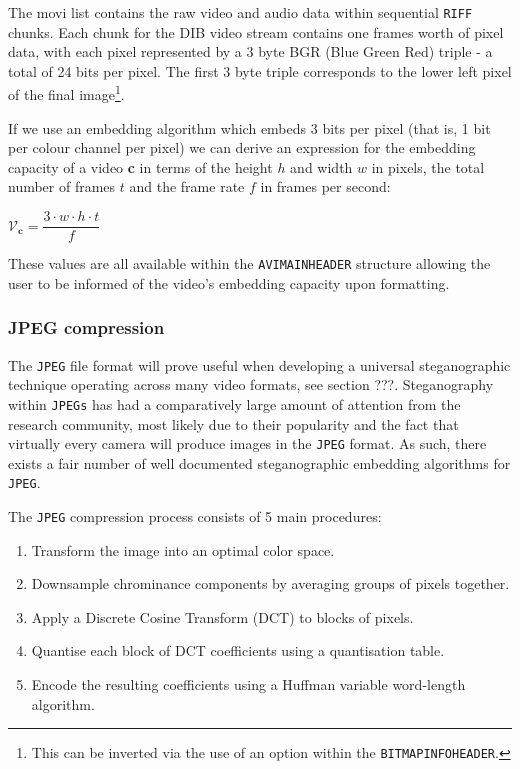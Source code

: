 \documentclass[paper=a4, fontsize=11pt,twoside]{scrartcl}    %
\begin{document}
The movi list contains the raw video and audio data within sequential \texttt{RIFF} chunks. Each chunk for the DIB video stream contains one frames worth of pixel data, with each pixel represented by a 3 byte BGR (Blue Green Red) triple - a total of 24 bits per pixel. The first 3 byte triple corresponds to the lower left pixel of the final image\footnote{This can be inverted via the use of an option within the \texttt{BITMAPINFOHEADER}.}. 

If we use an embedding algorithm which embeds 3 bits per pixel (that is, 1 bit per colour channel per pixel) we can derive an expression for the embedding capacity of a video \textbf{c} in terms of the height $h$ and width $w$ in pixels, the total number of frames $t$ and the frame rate $f$ in frames per second:
\begin{center}
	$\mathcal{V} _{\textbf{c}} = \dfrac{3 \cdot w \cdot h \cdot t}{f}$
\end{center}  
\noindent
These values are all available within the \texttt{AVIMAINHEADER} structure allowing the user to be informed of the video's embedding capacity upon formatting.

\subsubsection{JPEG compression}

The \texttt{JPEG} file format will prove useful when developing a universal steganographic technique operating across many video formats, see section ???. Steganography within \texttt{JPEGs} has had a comparatively large amount of attention from the research community, most likely due to their popularity and the fact that virtually every camera will produce images in the \texttt{JPEG} format. As such, there exists a fair number of well documented steganographic embedding algorithms for \texttt{JPEG}.

The \texttt{JPEG} compression process consists of 5 main procedures:
\begin{enumerate}
	\item Transform the image into an optimal color space. 
	\item Downsample chrominance components by averaging groups of pixels together.
	\item Apply a Discrete Cosine Transform (DCT) to blocks of pixels. 
	\item Quantise each block of DCT coefficients using a quantisation table. 
	\item Encode the resulting coefficients using a Huffman variable word-length algorithm. 
\end{enumerate}
\end{document}
